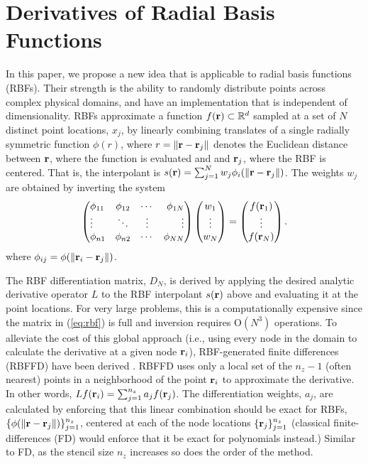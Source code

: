 \documentclass[10pt,conference,compsocconf]{IEEEtran}
\begin{document}
\section{Derivatives of Radial Basis Functions}
\label{sec:rbf}

In this paper, we propose a new idea that is applicable to radial
basis functions (RBFs). Their strength is the ability to randomly
distribute points across complex physical domains, and have an
implementation that is independent of dimensionality. RBFs approximate
a function $f({\bf r})\subset \mathbb{R}^d$ sampled at a set of $N$
distinct point locations, $x_j$, by linearly combining translates of a
single radially symmetric function $\phi(r)$, where $r =
\|{\bf r}-{\bf r}_{j}\|$ denotes the Euclidean distance %
between ${\bf r}$, where the function is evaluated
and and ${\bf r}_j$,  where the RBF is centered. That is, the
interpolant is $s({\bf r}) = \sum_{j=1}^{N} w_j
\phi_i(\|{\bf r}-{\bf r}_{j}\|)$. The weights $w_j$ are obtained by
inverting the system
\begin{equation}
\parray{lccr}{
\phi_{11} & \phi_{12} & \cdots & \phi_{1N} \\
\vdots & \ddots & \vdots & \vdots \\
\phi_{n1} & \phi_{n2} & \cdots & \phi_{NN} 
}
\parray{c}{ w_{1} \\ \vdots \\ w_{N} }
=
\parray{c}{ f(\rvec_1) \\ \vdots\\ f(\rvec_N) }. 
\label{eq:rbf}
\end{equation}
where $\phi_{ij} = \phi(\|{\bf r}_i-{\bf r}_j\|)$. 

The RBF differentiation matrix, $D_N$, is derived by applying the
desired analytic derivative operator $L$ to the RBF interpolant
$s({\bf r})$ above and evaluating it at the point locations. For very
large problems, this is a computationally expensive since the matrix
in (\ref{eq:rbf}) is full and inversion requires O$(N^3)$
operations. To alleviate the cost of this global approach (i.e., using
every node in the domain to calculate the derivative at a given node
${\bf r}_i$), RBF-generated finite differences (RBFFD) have been
derived \cite{TAI1,TAI2,SDY02,WrFo06,FoL11,FLBWSC12}. RBFFD uses only
a local set of the $n_z-1$  (often nearest) points in a neighborhood of 
the point ${\bf r}_i$ to
approximate the derivative. In other words,
$Lf({\bf r}_i)=\sum_{j=1}^{n_z}a_jf({\bf r}_j)$. The differentiation
weights, $a_j$, are calculated by enforcing that this linear
combination should be exact for RBFs,
$\{\phi(\|{\bf r}-{\bf r}_{j}\|)\}_{j=1}^{n_z}$, centered at each of the
node locations $\{{\bf r}_j\}_{j=1}^{n_z}$ (classical finite-differences
(FD) would enforce that it be exact for polynomials instead.) Similar
to FD, as the stencil size $n_z$ increases so does the order of the
method.
\end{document}
